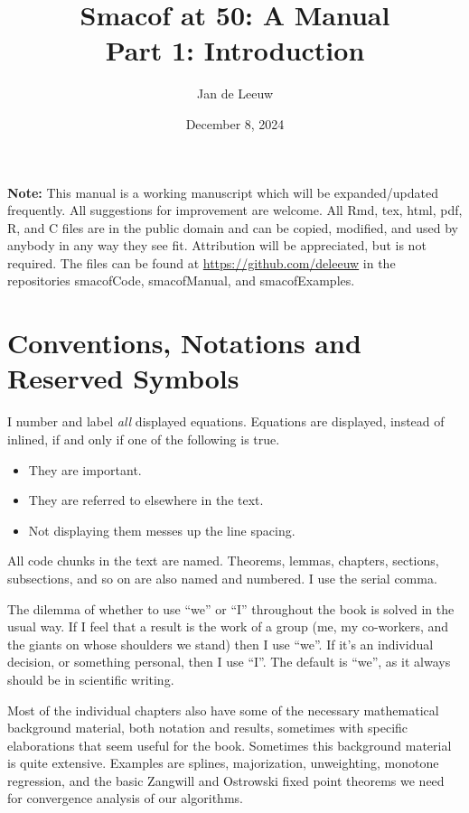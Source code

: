 \documentclass[
  12pt,
  letterpaper,
  DIV=11,
  numbers=noendperiod]{scrartcl}
\title{Smacof at 50: A Manual\\
Part 1: Introduction}
\author{Jan de Leeuw}
\date{December 8, 2024}
\providecommand{\tightlist}{%
  \setlength{\itemsep}{0pt}\setlength{\parskip}{0pt}}\usepackage{longtable,booktabs,array}
\newcommand{\sectionbreak}{\clearpage}
\renewcommand*\contentsname{Table of contents}
\newcommand\contentsname{Table of contents}
\begin{document}
\maketitle

\renewcommand*\contentsname{Table of contents}
{
\hypersetup{linkcolor=}
\setcounter{tocdepth}{3}
\tableofcontents
}

\sectionbreak

\textbf{Note:} This manual is a working manuscript which will be
expanded/updated frequently. All suggestions for improvement are
welcome. All Rmd, tex, html, pdf, R, and C files are in the public
domain and can be copied, modified, and used by anybody in any way they
see fit. Attribution will be appreciated, but is not required. The files
can be found at \url{https://github.com/deleeuw} in the repositories
smacofCode, smacofManual, and smacofExamples.

\sectionbreak

\section*{Conventions, Notations and Reserved
Symbols}\label{conventions-notations-and-reserved-symbols}

I number and label \emph{all} displayed equations. Equations are
displayed, instead of inlined, if and only if one of the following is
true.

\begin{itemize}
\tightlist
\item
  They are important.
\item
  They are referred to elsewhere in the text.
\item
  Not displaying them messes up the line spacing.
\end{itemize}

All code chunks in the text are named. Theorems, lemmas, chapters,
sections, subsections, and so on are also named and numbered. I use the
serial comma.

The dilemma of whether to use ``we'' or ``I'' throughout the book is
solved in the usual way. If I feel that a result is the work of a group
(me, my co-workers, and the giants on whose shoulders we stand) then I
use ``we''. If it's an individual decision, or something personal, then
I use ``I''. The default is ``we'', as it always should be in scientific
writing.

Most of the individual chapters also have some of the necessary
mathematical background material, both notation and results, sometimes
with specific elaborations that seem useful for the book. Sometimes this
background material is quite extensive. Examples are splines,
majorization, unweighting, monotone regression, and the basic Zangwill
and Ostrowski fixed point theorems we need for convergence analysis of
our algorithms.
\end{document}
